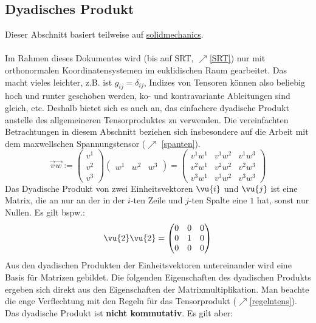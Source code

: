 \subsection{Dyadisches Produkt}\label{dyad}
Dieser Abschnitt basiert teilweise auf \href{https://solidmechanics.org/text/AppendixD/AppendixD.htm}{solidmechanics}.\\\\
 Im Rahmen dieses Dokumentes wird (bis auf SRT, $\nearrow$\ref{SRT}) nur mit orthonormalen Koordinatensystemen im euklidischen Raum gearbeitet. Das macht vieles leichter, z.B. ist $g_{ij}=\delta_{ij}$, Indizes von Tensoren können also beliebig hoch und runter geschoben werden, ko- und kontravariante Ableitungen sind gleich, etc. Deshalb bietet sich es auch an, das einfachere dyadische Produkt anstelle des allgemeineren Tensorproduktes zu verwenden. Die vereinfachten Betrachtungen in diesem Abschnitt beziehen sich insbesondere auf die Arbeit mit dem maxwellschen Spannungstensor ($\nearrow$ \ref{spanten}).
	\begin{equation}
		\vec{v}\vec{w}:=\begin{pmatrix}v^1\\v^2\\v^3\end{pmatrix}\begin{pmatrix}w^1&w^2&w^3\end{pmatrix}=\begin{pmatrix}v^1w^1&v^1w^2&v^1w^3\\v^2w^1&v^2w^2&v^2w^3\\v^3w^1&v^3w^2&v^3w^3\end{pmatrix}
	\end{equation}
	Das Dyadische Produkt von zwei Einheitsvektoren $\vu{i}$ und $\vu{j}$ ist eine Matrix, die an nur an der in der $i$-ten Zeile und $j$-ten Spalte eine $1$ hat, sonst nur Nullen. Es gilt bspw.:
	\begin{equation}
		\vu{2}\vu{2}=\begin{pmatrix}
			0&0&0\\
			0&1&0\\
			0&0&0
		\end{pmatrix}
	\end{equation}
Aus den dyadischen Produkten der Einheitsvektoren untereinander wird eine Basis für Matrizen gebildet. Die folgenden Eigenschaften des dyadischen Produkts ergeben sich direkt aus den Eigenschaften der Matrixmultiplikation. Man beachte die enge Verflechtung mit den Regeln für das Tensorprodukt ($\nearrow$\ref{regelntens}).
	Das dyadische Produkt ist \textbf{nicht kommutativ}. Es gilt aber:
